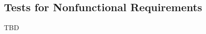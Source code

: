 \documentclass[10pt,titlepage]{article}
\begin{document}



					
					
					


					

					
					
					



    



\subsection{Tests for Nonfunctional Requirements}

TBD
\end{document}
